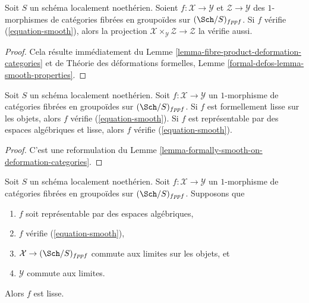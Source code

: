 \begin{lemma}
\label{lemma-base-change-smooth}
Soit $S$ un schéma localement noethérien. Soient $f : \mathcal{X} \to \mathcal{Y}$
et $\mathcal{Z} \to \mathcal{Y}$ des $1$-morphismes de
catégories fibrées en groupoïdes sur $(\Sch/S)_{fppf}$. Si $f$
vérifie (\ref{equation-smooth}), alors la projection
$\mathcal{X} \times_\mathcal{Y} \mathcal{Z} \to \mathcal{Z}$ la vérifie aussi.
\end{lemma}

\begin{proof}
Cela résulte immédiatement du
Lemme \ref{lemma-fibre-product-deformation-categories}
et de
Théorie des déformations formelles, Lemme
\ref{formal-defos-lemma-smooth-properties}.
\end{proof}

\begin{lemma}
\label{lemma-smooth-smooth}
Soit $S$ un schéma localement noethérien. Soit $f : \mathcal{X} \to \mathcal{Y}$
un $1$-morphisme de catégories fibrées en groupoïdes sur $(\Sch/S)_{fppf}$.
Si $f$ est formellement lisse sur les objets, alors $f$ vérifie
(\ref{equation-smooth}). Si $f$ est représentable par des espaces algébriques
et lisse, alors $f$ vérifie (\ref{equation-smooth}).
\end{lemma}

\begin{proof}
C'est une reformulation du Lemme \ref{lemma-formally-smooth-on-deformation-categories}.
\end{proof}

\begin{lemma}
\label{lemma-implies-smooth}
Soit $S$ un schéma localement noethérien. Soit $f : \mathcal{X} \to \mathcal{Y}$
un $1$-morphisme de catégories fibrées en groupoïdes sur $(\Sch/S)_{fppf}$.
Supposons que
\begin{enumerate}
\item $f$ soit représentable par des espaces algébriques,
\item $f$ vérifie (\ref{equation-smooth}),
\item $\mathcal{X} \to (\Sch/S)_{fppf}$ commute aux limites sur les objets, et
\item $\mathcal{Y}$ commute aux limites.
\end{enumerate}
Alors $f$ est lisse.
\end{lemma}

